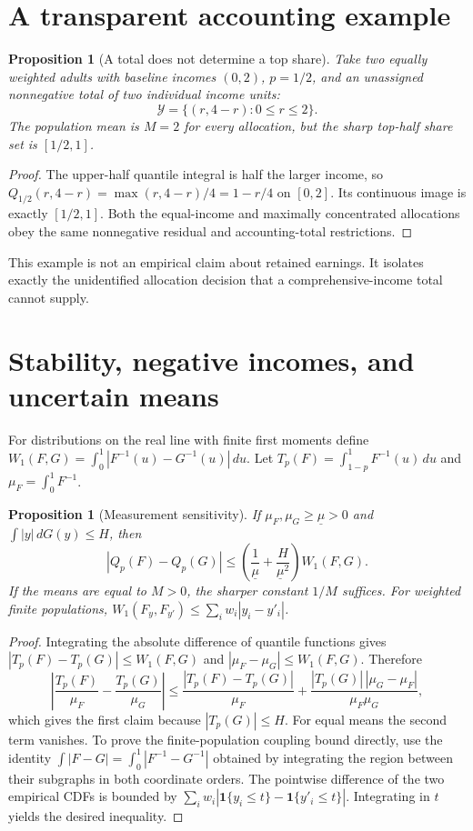 \documentclass[11pt]{article}
\newtheorem{proposition}[theorem]{Proposition}
\theoremstyle{remark}\newtheorem{remark}[theorem]{Remark}
\newcommand{\Ind}{\mathbf 1}
\begin{document}
\section{A transparent accounting example}
\begin{proposition}[A total does not determine a top share]
Take two equally weighted adults with baseline incomes $(0,2)$, $p=1/2$, and an unassigned nonnegative total of two individual income units:
\[
 \mathcal Y=\{(r,4-r):0\leq r\leq2\}.
\]
The population mean is $M=2$ for every allocation, but the sharp top-half share set is $[1/2,1]$.
\end{proposition}
\begin{proof}
The upper-half quantile integral is half the larger income, so
$Q_{1/2}(r,4-r)=\max(r,4-r)/4=1-r/4$ on $[0,2]$. Its continuous image is exactly $[1/2,1]$. Both the equal-income and maximally concentrated allocations obey the same nonnegative residual and accounting-total restrictions.
\end{proof}
This example is not an empirical claim about retained earnings. It isolates exactly the unidentified allocation decision that a comprehensive-income total cannot supply.

\section{Stability, negative incomes, and uncertain means}
For distributions on the real line with finite first moments define
$W_1(F,G)=\int_0^1|F^{-1}(u)-G^{-1}(u)|\,du$. Let
$T_p(F)=\int_{1-p}^1F^{-1}(u)\,du$ and $\mu_F=\int_0^1F^{-1}$.

\begin{proposition}[Measurement sensitivity]\label{stability}
If $\mu_F,\mu_G\geq\underline\mu>0$ and
$\int|y|\,dG(y)\leq H$, then
\[
 |Q_p(F)-Q_p(G)|
 \leq\left(\frac1{\underline\mu}+
                   \frac{H}{\underline\mu^2}\right)W_1(F,G).
\]
If the means are equal to $M>0$, the sharper constant $1/M$ suffices. For weighted finite populations,
$W_1(F_y,F_{y'})\leq\sum_iw_i|y_i-y'_i|$.
\end{proposition}
\begin{proof}
Integrating the absolute difference of quantile functions gives
$|T_p(F)-T_p(G)|\leq W_1(F,G)$ and
$|\mu_F-\mu_G|\leq W_1(F,G)$. Therefore
\[
 \left|\frac{T_p(F)}{\mu_F}-\frac{T_p(G)}{\mu_G}\right|
 \leq\frac{|T_p(F)-T_p(G)|}{\mu_F}
  +\frac{|T_p(G)|\,|\mu_G-\mu_F|}{\mu_F\mu_G},
\]
which gives the first claim because $|T_p(G)|\leq H$. For equal means the second term vanishes. To prove the finite-population coupling bound directly, use the identity
$\int|F-G|=\int_0^1|F^{-1}-G^{-1}|$ obtained by integrating the region between their subgraphs in both coordinate orders. The pointwise difference of the two empirical CDFs is bounded by
$\sum_iw_i|\Ind\{y_i\leq t\}-\Ind\{y'_i\leq t\}|$.
Integrating in $t$ yields the desired inequality.
\end{proof}
\end{document}
